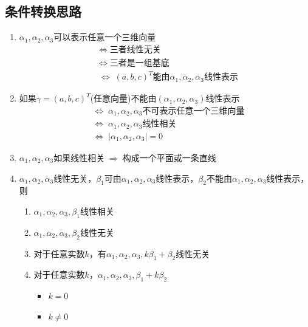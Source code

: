 \documentclass[./linear_algebra.tex]{subfiles}
\begin{document}
    \subsection{条件转换思路}

    \begin{enumerate}
        \item $\alpha_1, \alpha_2, \alpha_3$可以表示任意一个三维向量
        \begin{align*}
            &\Leftrightarrow\; \text{三者线性无关}  \\
            &\Leftrightarrow\; \text{三者是一组基底}  \\
            &\Leftrightarrow\; (a, b, c)^T\text{能由}\alpha_1, \alpha_2, \alpha_3\text{线性表示}
        \end{align*}
        \item 如果$\gamma = (a, b, c)^T$(任意向量)不能由$(\alpha_1, \alpha_2, \alpha_3)$线性表示
        \begin{align*}
            &\Leftrightarrow\; \alpha_1, \alpha_2, \alpha_3\text{不可表示任意一个三维向量}  \\
            &\Leftrightarrow\; \alpha_1, \alpha_2, \alpha_3\text{线性相关}  \\
            &\Leftrightarrow\; |\alpha_1, \alpha_2, \alpha_3| = 0
        \end{align*}
        \item $\alpha_1, \alpha_2, \alpha_3\text{如果线性相关} \;\Rightarrow\; \text{构成一个平面或一条直线}$
        \item $\alpha_1, \alpha_2, \alpha_3$线性无关，$\beta_1$可由$\alpha_1, \alpha_2, \alpha_3$线性表示，$\beta_2$不能由$\alpha_1, \alpha_2, \alpha_3$线性表示，则
        \begin{enumerate}
            \item $\alpha_1, \alpha_2, \alpha_3, \beta_1$线性相关
            \item $\alpha_1, \alpha_2, \alpha_3, \beta_2$线性无关
            \item 对于任意实数$k$，有$\alpha_1, \alpha_2, \alpha_3, k\beta_1 + \beta_2$线性无关
            \item 对于任意实数$k$，$\alpha_1, \alpha_2, \alpha_3, \beta_1 + k\beta_2$
            \begin{itemize}
                \item $k = 0$ \Rightarrow {}
                \item $k \neq 0$ \Rightarrow {}
            \end{itemize}

\end{enumerate}
\end{enumerate}
\end{document}
